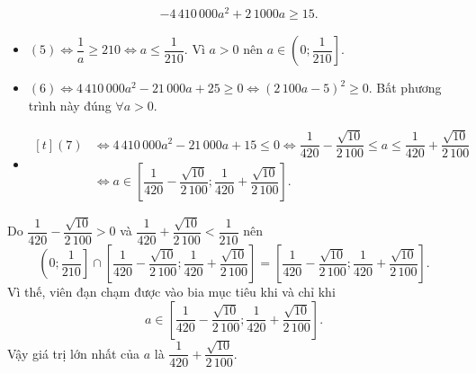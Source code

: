 \begin{ex}
{\begin{align*}
			&-4\,410\,000a^2+2\,1000a\geq 15  \tag{7}.
		\end{align*}
		\begin{itemize}
			\item $(5)\Leftrightarrow\dfrac{1}{a}\geq 210\Leftrightarrow a\leq\dfrac{1}{210}$. Vì $a>0$ nên $a\in\left(0;\dfrac{1}{210}\right]$.
			\item $(6) \Leftrightarrow 4\,410\,000a^2-21\,000a+25\geq 0 \Leftrightarrow(2\,100a-5)^2\geq 0$. Bất phương trình này đúng $\forall a>0$.
			\item \allowdisplaybreaks
			$\begin{aligned}[t]
				(7)&\Leftrightarrow 4\,410\,000a^2-21\,000a+15\leq 0\Leftrightarrow\dfrac{1}{420}-\dfrac{\sqrt{10}}{2\,100}\leq a\leq\dfrac{1}{420}+\dfrac{\sqrt{10}}{2\,100}\\
				&\Leftrightarrow a\in\left[\dfrac{1}{420}-\dfrac{\sqrt{10}}{2\,100};\dfrac{1}{420}+\dfrac{\sqrt{10}}{2\,100}\right].
			\end{aligned}$
		\end{itemize}
		Do $\dfrac{1}{420}-\dfrac{\sqrt{10}}{2\,100}>0$ và $\dfrac{1}{420}+\dfrac{\sqrt{10}}{2\,100}<\dfrac{1}{210}$ nên
		\[\left(0;\dfrac{1}{210}\right]\cap\left[\dfrac{1}{420}-\dfrac{\sqrt{10}}{2\,100};\dfrac{1}{420}+\dfrac{\sqrt{10}}{2\,100}\right]=\left[\dfrac{1}{420}-\dfrac{\sqrt{10}}{2\,100};\dfrac{1}{420}+\dfrac{\sqrt{10}}{2\,100}\right].\]
		Vì thế, viên đạn chạm được vào bia mục tiêu khi và chỉ khi
		\[a\in\left[\dfrac{1}{420}-\dfrac{\sqrt{10}}{2\,100};\dfrac{1}{420}+\dfrac{\sqrt{10}}{2\,100}\right].\]
		Vậy giá trị lớn nhất của $a$ là $\dfrac{1}{420}+\dfrac{\sqrt{10}}{2\,100}$.
	}
\end{ex}


